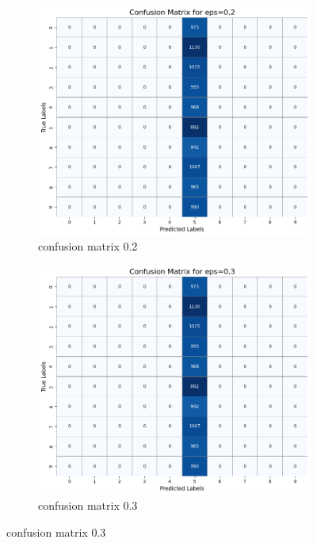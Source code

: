 \documentclass[11pt,onside]{article}
\begin{document}
\begin{figure}[h]
  \centering
  \begin{subfigure}[b]{0.49\textwidth}
    \centering
    \includegraphics[width=\textwidth]{V2_images/confusion_matrix_eps_0.2.png}
    \caption{confusion matrix 0.2}
    \label{fig:image1}
  \end{subfigure}
  \hfill
  \begin{subfigure}[b]{0.49\textwidth}
    \centering
    \includegraphics[width=\textwidth]{V2_images/confusion_matrix_eps_0.3.png}
    \caption{confusion matrix 0.3}
    \label{fig:image2}
  \end{subfigure}
 
  \label{fig:images}
\end{figure}
\end{document}
